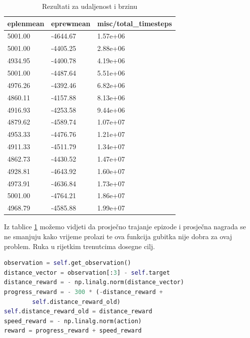 \documentclass[times,utf8,diplomski]{fer}
\begin{document}
\begin{table}[ht!]
\centering
\caption{Rezultati za udaljenost i brzinu}
\label{tab:rub}
\begin{tabular}{@{}lll@{}}
\hline
eplenmean & eprewmean & misc/total\_timesteps \\
\hline
\hline
5001.00 & -4644.67 & 1.57e+06 \\ 
5001.00 & -4405.25 & 2.88e+06 \\ 
4934.95 & -4400.78 & 4.19e+06 \\ 
5001.00 & -4487.64 & 5.51e+06 \\ 
4976.26 & -4392.46 & 6.82e+06 \\ 
4860.11 & -4157.88 & 8.13e+06 \\ 
4916.93 & -4253.58 & 9.44e+06 \\ 
4879.62 & -4589.74 & 1.07e+07 \\ 
4953.33 & -4476.76 & 1.21e+07 \\ 
4911.33 & -4511.79 & 1.34e+07 \\ 
4862.73 & -4430.52 & 1.47e+07 \\ 
4928.81 & -4643.92 & 1.60e+07 \\ 
4973.91 & -4636.84 & 1.73e+07 \\ 
5001.00 & -4764.21 & 1.86e+07 \\ 
4968.79 & -4585.88 & 1.99e+07 \\ 
\hline
\end{tabular}
\end{table}

Iz tablice \ref{tab:rub} možemo vidjeti da prosječno trajanje epizode i prosječna nagrada se ne smanjuju kako vrijeme prolazi te ova funkcija gubitka nije dobra za ovaj problem. Ruka u rijetkim trenutcima dosegne cilj.


\begin{lstlisting}[caption={Kod za napredak i brzina},language=Python]
observation = self.get_observation()
distance_vector = observation[:3] - self.target
distance_reward = - np.linalg.norm(distance_vector)
progress_reward = - 300 * (-distance_reward +
		self.distance_reward_old)
self.distance_reward_old = distance_reward
speed_reward = - np.linalg.norm(action)
reward = progress_reward + speed_reward
\end{lstlisting}
\end{document}
